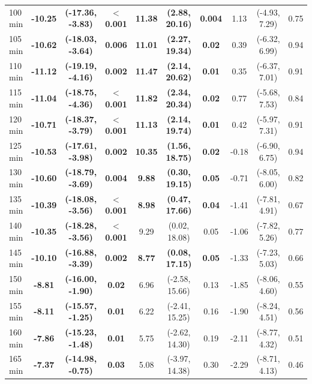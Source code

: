 \begin{table}[ht]
{\begin{tabular}{lccccccccc}
100 min & \textbf{-10.25} & \textbf{(-17.36, -3.83)} & \textbf{$<$0.001} & \textbf{11.38} & \textbf{(2.88, 20.16)} & \textbf{0.004} & 1.13 & (-4.93, 7.29) & 0.75 \\
105 min & \textbf{-10.62} & \textbf{(-18.03, -3.64)} & \textbf{0.006} & \textbf{11.01} & \textbf{(2.27, 19.34)} & \textbf{0.02} & 0.39 & (-6.32, 6.99) & 0.94 \\
110 min & \textbf{-11.12} & \textbf{(-19.19, -4.16)} & \textbf{0.002} & \textbf{11.47} & \textbf{(2.14, 20.62)} & \textbf{0.01} & 0.35 & (-6.37, 7.01) & 0.91 \\
115 min & \textbf{-11.04} & \textbf{(-18.75, -4.36)} & \textbf{$<$0.001} & \textbf{11.82} & \textbf{(2.34, 20.34)} & \textbf{0.02} & 0.77 & (-5.68, 7.53) & 0.84 \\
120 min & \textbf{-10.71} & \textbf{(-18.37, -3.79)} & \textbf{$<$0.001} & \textbf{11.13} & \textbf{(2.14, 19.74)} & \textbf{0.01} & 0.42 & (-5.97, 7.31) & 0.91 \\
125 min & \textbf{-10.53} & \textbf{(-17.61, -3.98)} & \textbf{0.002} & \textbf{10.35} & \textbf{(1.56, 18.75)} & \textbf{0.02} & -0.18 & (-6.90, 6.75) & 0.94 \\
130 min & \textbf{-10.60} & \textbf{(-18.79, -3.69)} & \textbf{0.004} & \textbf{9.88} & \textbf{(0.30, 19.15)} & \textbf{0.05} & -0.71 & (-8.05, 6.00) & 0.82 \\
135 min & \textbf{-10.39} & \textbf{(-18.08, -3.56)} & \textbf{$<$0.001} & \textbf{8.98} & \textbf{(0.47, 17.66)} & \textbf{0.04} & -1.41 & (-7.81, 4.91) & 0.67 \\
140 min & \textbf{-10.35} & \textbf{(-18.28, -3.56)} & \textbf{$<$0.001} & 9.29 & (0.02, 18.08) & 0.05 & -1.06 & (-7.82, 5.26) & 0.77 \\
145 min & \textbf{-10.10} & \textbf{(-16.88, -3.39)} & \textbf{0.002} & \textbf{8.77} & \textbf{(0.08, 17.15)} & \textbf{0.05} & -1.33 & (-7.23, 5.03) & 0.66 \\
150 min & \textbf{-8.81} & \textbf{(-16.00, -1.90)} & \textbf{0.02} & 6.96 & (-2.58, 15.66) & 0.13 & -1.85 & (-8.06, 4.60) & 0.55 \\
155 min & \textbf{-8.11} & \textbf{(-15.57, -1.25)} & \textbf{0.01} & 6.22 & (-2.41, 15.25) & 0.16 & -1.90 & (-8.24, 4.51) & 0.56 \\
160 min & \textbf{-7.86} & \textbf{(-15.23, -1.48)} & \textbf{0.01} & 5.75 & (-2.62, 14.30) & 0.19 & -2.11 & (-8.77, 4.32) & 0.51 \\
165 min & \textbf{-7.37} & \textbf{(-14.98, -0.75)} & \textbf{0.03} & 5.08 & (-3.97, 14.38) & 0.30 & -2.29 & (-8.71, 4.13) & 0.46 \\

\end{tabular}}
\end{table}
